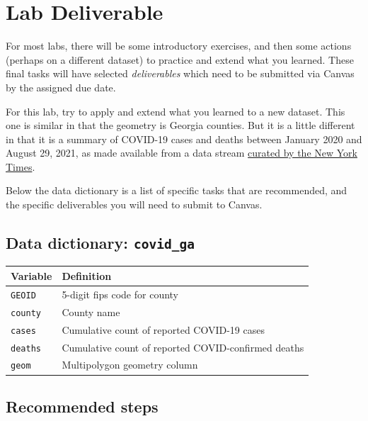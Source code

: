 \documentclass[
]{book}
\begin{document}
\hypertarget{lab-deliverable}{%
\section{Lab Deliverable}\label{lab-deliverable}}

For most labs, there will be some introductory exercises, and then some actions (perhaps on a different dataset) to practice and extend what you learned. These final tasks will have selected \emph{deliverables} which need to be submitted via Canvas by the assigned due date.

For this lab, try to apply and extend what you learned to a new dataset. This one is similar in that the geometry is Georgia counties. But it is a little different in that it is a summary of COVID-19 cases and deaths between January 2020 and August 29, 2021, as made available from a data stream \href{https://github.com/nytimes/covid-19-data}{curated by the New York Times}.

Below the data dictionary is a list of specific tasks that are recommended, and the specific deliverables you will need to submit to Canvas.

\hypertarget{data-dictionary-covid_ga}{%
\subsection{\texorpdfstring{Data dictionary: \texttt{covid\_ga}}{Data dictionary: covid\_ga}}\label{data-dictionary-covid_ga}}

\begin{longtable}[]{@{}ll@{}}
\toprule()
Variable & Definition \\
\midrule()
\endhead
\texttt{GEOID} & 5-digit fips code for county \\
\texttt{county} & County name \\
\texttt{cases} & Cumulative count of reported COVID-19 cases \\
\texttt{deaths} & Cumulative count of reported COVID-confirmed deaths \\
\texttt{geom} & Multipolygon geometry column \\
\bottomrule()
\end{longtable}

\hypertarget{recommended-steps}{%
\subsection{Recommended steps}\label{recommended-steps}}
\end{document}
